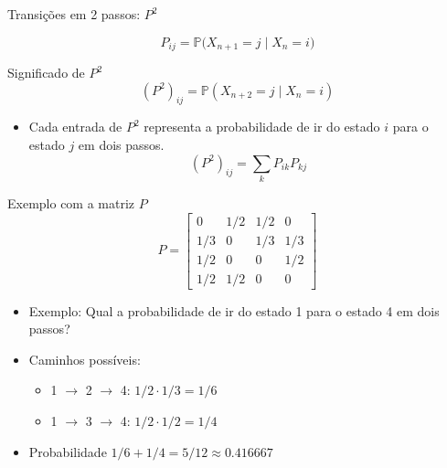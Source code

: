 \documentclass{beamer}
\begin{document}

\begin{frame}{Transições em 2 passos: $P^2$}

  \vfill

   $$P_{ij} = \mathbb{P} \big( X_{n+1} = j \mid X_n=i \big)$$

   \vfill
   
  \begin{block}{Significado de $P^2$}\pause
    \[ (P^2)_{ij} = \mathbb{P}(X_{n+2} = j \mid X_n = i) \]
  \end{block}

   \vfill
  
  \begin{itemize}
  \item Cada entrada de $P^2$ representa a probabilidade de ir do estado $i$ para o estado $j$ em dois passos.
    \[ (P^2)_{ij} = \sum_k P_{ik} P_{kj} \]
  \end{itemize}
\end{frame}


\begin{frame}{Exemplo com a matriz $P$}
  \[ P = \begin{bmatrix}
      0 & {1}/{2} & {1}/{2} & 0 \\
      {1}/{3} & 0 & {1}/{3} & {1}/{3} \\
      {1}/{2} & 0 & 0 & {1}/{2} \\
      {1}/{2} & {1}/{2} & 0 & 0
    \end{bmatrix} \]
  \pause
  \begin{itemize}
  \item Exemplo: Qual a probabilidade de ir do estado 1 para o estado 4 em dois passos?
  \item Caminhos possíveis:
    \begin{itemize}
    \item 1 $\to$ 2 $\to$ 4: ${1}/{2} \cdot {1}/{3} = {1}/{6}$
    \item 1 $\to$ 3 $\to$ 4: ${1}/{2} \cdot {1}/{2} = {1}/{4}$
    \end{itemize}
  \item  Probabilidade ${1}/{6} + {1}/{4} = {5}/{12} \approx 0.416667$
  \end{itemize}
\end{frame}
\end{document}
